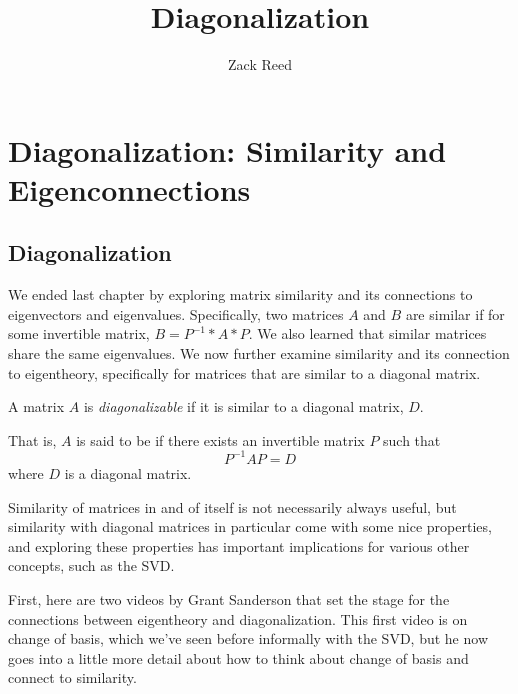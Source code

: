 \documentclass{ximera}
\author{Zack Reed}
\title{Diagonalization}
\begin{document}
\begin{abstract}

\end{abstract}
\maketitle

\section*{Diagonalization: Similarity and Eigenconnections}

\subsection*{Diagonalization}

We ended last chapter by exploring matrix similarity and its connections to eigenvectors and eigenvalues. Specifically, two matrices $A$ and $B$ are similar if for some invertible matrix, $B=P^{-1}*A*P$. We also learned that similar matrices share the same eigenvalues. We now further examine similarity and its connection to eigentheory, specifically for matrices that are similar to a diagonal matrix. 

\begin{definition}
  A matrix $A$ is \emph{diagonalizable} if it is similar to a diagonal matrix, $D$. 

  That is, $A$ is said to be  if there exists an invertible matrix $P$ such that
\begin{equation*}
P^{-1}AP=D
\end{equation*}
where $D$ is a diagonal matrix.
\end{definition}

Similarity of matrices in and of itself is not necessarily always useful, but similarity with diagonal matrices in particular come with some nice properties, and exploring these properties has important implications for various other concepts, such as the SVD.

First, here are two videos by Grant Sanderson that set the stage for the connections between eigentheory and diagonalization. This first video is on change of basis, which we've seen before informally with the SVD, but he now goes into a little more detail about how to think about change of basis and connect to similarity.

\begin{center}
\end{center}
\end{document}
